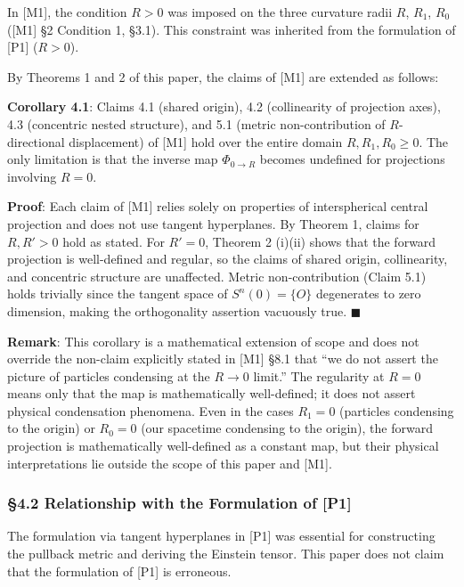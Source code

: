 \documentclass[
  a4paper]{article}
\begin{document}
In {[}M1{]}, the condition \(R > 0\) was imposed on the three curvature
radii \(R\), \(R_1\), \(R_0\) ({[}M1{]} §2 Condition 1, §3.1). This
constraint was inherited from the formulation of {[}P1{]} (\(R > 0\)).

By Theorems 1 and 2 of this paper, the claims of {[}M1{]} are extended
as follows:

\textbf{Corollary 4.1}: Claims 4.1 (shared origin), 4.2 (collinearity of
projection axes), 4.3 (concentric nested structure), and 5.1 (metric
non-contribution of \(R\)-directional displacement) of {[}M1{]} hold
over the entire domain \(R, R_1, R_0 \geq 0\). The only limitation is
that the inverse map \(\Phi_{0 \to R}\) becomes undefined for
projections involving \(R = 0\).

\textbf{Proof}: Each claim of {[}M1{]} relies solely on properties of
interspherical central projection and does not use tangent hyperplanes.
By Theorem 1, claims for \(R, R' > 0\) hold as stated. For \(R' = 0\),
Theorem 2 (i)(ii) shows that the forward projection is well-defined and
regular, so the claims of shared origin, collinearity, and concentric
structure are unaffected. Metric non-contribution (Claim 5.1) holds
trivially since the tangent space of \(S^n(0) = \{O\}\) degenerates to
zero dimension, making the orthogonality assertion vacuously true.
\(\blacksquare\)

\textbf{Remark}: This corollary is a mathematical extension of scope and
does not override the non-claim explicitly stated in {[}M1{]} §8.1 that
``we do not assert the picture of particles condensing at the
\(R \to 0\) limit.'' The regularity at \(R = 0\) means only that the map
is mathematically well-defined; it does not assert physical condensation
phenomena. Even in the cases \(R_1 = 0\) (particles condensing to the
origin) or \(R_0 = 0\) (our spacetime condensing to the origin), the
forward projection is mathematically well-defined as a constant map, but
their physical interpretations lie outside the scope of this paper and
{[}M1{]}.

\subsubsection{§4.2 Relationship with the Formulation of
{[}P1{]}}\label{relationship-with-the-formulation-of-p1}

The formulation via tangent hyperplanes in {[}P1{]} was essential for
constructing the pullback metric and deriving the Einstein tensor. This
paper does not claim that the formulation of {[}P1{]} is erroneous.
\end{document}
